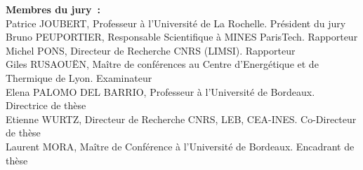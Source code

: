 \begin{titlepage}
\small{
\noindent \textbf{Membres du jury~:} \\ [0.2cm]
\noindent
Patrice JOUBERT, Professeur à l’Université de La Rochelle. \hfill Président du jury\\
Bruno PEUPORTIER, Responsable Scientifique à MINES ParisTech. \hfill Rapporteur\\
Michel PONS, Directeur de Recherche CNRS (LIMSI). \hfill Rapporteur\\
Giles RUSAOUËN, Maître de conférences au Centre d'Energétique et de Thermique de Lyon. \hfill Examinateur\\
Elena PALOMO DEL BARRIO, Professeur à l'Université de Bordeaux. \hfill Directrice de thèse\\
Etienne WURTZ, Directeur de Recherche CNRS, LEB, CEA-INES. \hfill Co-Directeur de thèse\\
Laurent MORA, Maître de Conférence à l’Université de Bordeaux. \hfill Encadrant de thèse\\
}

\end{titlepage}
